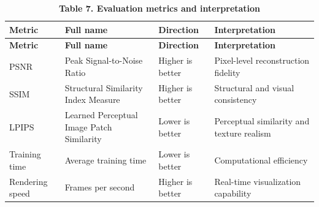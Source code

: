 \begin{longtable}[]{@{}
  >{\centering\arraybackslash}p{}
  >{\centering\arraybackslash}p{}
  >{\centering\arraybackslash}p{}
  >{\centering\arraybackslash}p{}@{}}
\caption{\textbf{Table 7. Evaluation metrics and
interpretation}}\tabularnewline
\toprule\noalign{}
\begin{minipage}[b]{\linewidth}\centering
\textbf{Metric}
\end{minipage} & \begin{minipage}[b]{\linewidth}\centering
\textbf{Full name}
\end{minipage} & \begin{minipage}[b]{\linewidth}\centering
\textbf{Direction}
\end{minipage} & \begin{minipage}[b]{\linewidth}\centering
\textbf{Interpretation}
\end{minipage} \\
\midrule\noalign{}
\endfirsthead
\toprule\noalign{}
\begin{minipage}[b]{\linewidth}\centering
\textbf{Metric}
\end{minipage} & \begin{minipage}[b]{\linewidth}\centering
\textbf{Full name}
\end{minipage} & \begin{minipage}[b]{\linewidth}\centering
\textbf{Direction}
\end{minipage} & \begin{minipage}[b]{\linewidth}\centering
\textbf{Interpretation}
\end{minipage} \\
\midrule\noalign{}
\endhead
\bottomrule\noalign{}
\endlastfoot
PSNR & Peak Signal-to-Noise Ratio & Higher is better &
Pixel-level reconstruction fidelity \\
SSIM & Structural Similarity Index Measure & Higher is
better & Structural and visual consistency \\
LPIPS & Learned Perceptual Image Patch Similarity & Lower
is better & Perceptual similarity and texture realism \\
Training time & Average training time & Lower is better &
Computational efficiency \\
Rendering speed & Frames per second & Higher is better &
Real-time visualization capability \\
\end{longtable}

